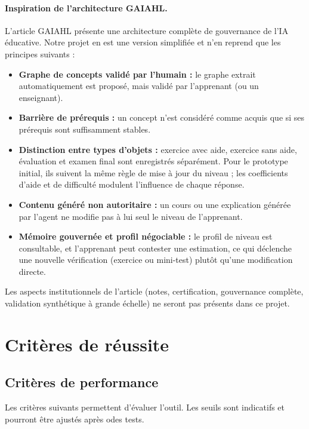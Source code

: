 \documentclass[11pt,a4paper]{article}
\begin{document}
\paragraph{Inspiration de l'architecture GAIAHL.}\label{sec:gaiahl}
L'article GAIAHL présente une architecture complète de gouvernance de l'IA éducative. Notre projet en est une version simplifiée et n'en reprend que les principes suivants :
\begin{itemize}[noitemsep]
  \item \textbf{Graphe de concepts validé par l'humain :} le graphe extrait automatiquement est proposé, mais validé par l'apprenant (ou un enseignant).
  \item \textbf{Barrière de prérequis :} un concept n'est considéré comme acquis que si ses prérequis sont suffisamment stables.
  \item \textbf{Distinction entre types d'objets :} exercice avec aide, exercice sans aide, évaluation et examen final sont enregistrés séparément. Pour le prototype initial, ils suivent la même règle de mise à jour du niveau ; les coefficients d'aide et de difficulté modulent l'influence de chaque réponse.
  \item \textbf{Contenu généré non autoritaire :} un cours ou une explication générée par l'agent ne modifie pas à lui seul le niveau de l'apprenant.
  \item \textbf{Mémoire gouvernée et profil négociable :} le profil de niveau est consultable, et l'apprenant peut contester une estimation, ce qui déclenche une nouvelle vérification (exercice ou mini-test) plutôt qu'une modification directe.
\end{itemize}
Les aspects institutionnels de l'article (notes, certification, gouvernance complète, validation synthétique à grande échelle) ne seront pas présents dans ce projet.

\section{Critères de réussite}

\subsection{Critères de performance}
\label{sec:perf}

Les critères suivants permettent d'évaluer l'outil. Les seuils sont indicatifs et pourront être ajustés après odes tests.
\end{document}
